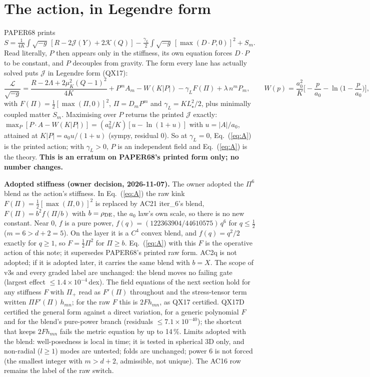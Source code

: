\documentclass[10pt]{article}
\begin{document}
\section{The action, in Legendre form}
PAPER68 prints $S=\frac1{4K}\int\!\sqrt{-g}\,[R-2\mathcal J(Y)+2\mathcal K(Q)]-\frac{\gamma_L}2\int\!\sqrt{-g}\,[\max(D\!\cdot\!P,0)]^2+S_m$.
Read literally, $P$ then appears only in the stiffness, its own equation forces $D\!\cdot\!P$ to be constant, and $P$ decouples from gravity.
The form every lane has actually solved puts $\mathcal J$ in Legendre form (QX17):
\begin{equation}
\frac{\mathcal L}{\sqrt{-g}}=\frac{R-2\Lambda+2\mu_K^2(Q-1)^2}{4K}+P^mA_m-W(K|P|)-\gamma_L F(\Pi)+\lambda\,n^mP_m,\qquad
W(p)=\frac{a_0^2}{K}\Big[-\frac p{a_0}-\ln\!\Big(1-\frac p{a_0}\Big)\Big],
\label{eq:A}\end{equation}
with $F(\Pi)=\tfrac12[\max(\Pi,0)]^2$, $\Pi=D_mP^m$ and $\gamma_L=KL_\star^2/2$, plus minimally coupled matter $S_m$.
Maximising over $P$ returns the printed $\mathcal J$ exactly: $\max_P[P\!\cdot\!A-W(K|P|)]=(a_0^2/K)[u-\ln(1+u)]$ with $u=|A|/a_0$, attained at $K|P|=a_0u/(1+u)$ (sympy, residual 0).
So at $\gamma_L=0$, Eq.~(\ref{eq:A}) is the printed action; with $\gamma_L>0$, $P$ is an independent field and Eq.~(\ref{eq:A}) is the theory.
\textbf{This is an erratum on PAPER68's printed form only; no number changes.}

\textbf{Adopted stiffness (owner decision, 2026-11-07).} The owner adopted the $\Pi^6$ blend as the action's stiffness. In Eq.~(\ref{eq:A}) the raw kink $F(\Pi)=\tfrac12[\max(\Pi,0)]^2$ is replaced by AC21 iter\_6's blend, $F(\Pi)=b^2f(\Pi/b)$ with $b=\rho_{\rm DE}$, the $a_0$ law's own scale, so there is no new constant. Near 0, $f$ is a pure power, $f(q)=(122363904/44610575)\,q^6$ for $q\le\tfrac12$ ($m=6>d+2=5$). On the layer it is a $C^4$ convex blend, and $f(q)=q^2/2$ exactly for $q\ge1$, so $F=\tfrac12\Pi^2$ for $\Pi\ge b$. Eq.~(\ref{eq:A}) with this $F$ is the operative action of this note; it supersedes PAPER68's printed raw form. AC2q is not adopted; if it is adopted later, it carries the same blend with $b=X$. The scope of v3s and every graded label are unchanged: the blend moves no failing gate (largest effect $\le1.4\times10^{-4}$\,dex). The field equations of the next section hold for any stiffness $F$ with $\Pi_+$ read as $F'(\Pi)$ throughout and the stress-tensor term written $\Pi F'(\Pi)\,h_{mn}$; for the raw $F$ this is $2F h_{mn}$, as QX17 certified. QX17D certified the general form against a direct variation, for a generic polynomial $F$ and for the blend's pure-power branch (residuals $\le7.1\times10^{-40}$); the shortcut that keeps $2Fh_{mn}$ fails the metric equation by up to 14\,\%. Limits adopted with the blend: well-posedness is local in time; it is tested in spherical 3D only, and non-radial ($l\ge1$) modes are untested; folds are unchanged; power 6 is not forced (the smallest integer with $m>d+2$, admissible, not unique). The AC16 row remains the label of the raw switch.
\end{document}
